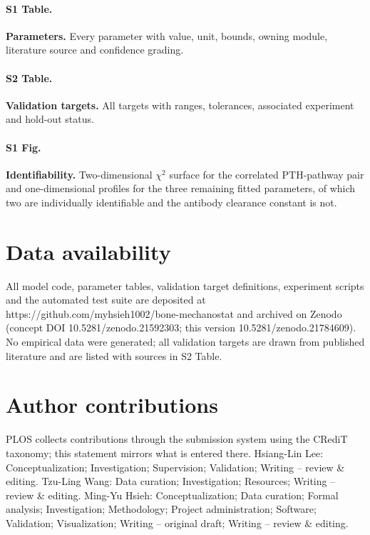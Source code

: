 \documentclass[10pt,letterpaper]{article}
\begin{document}
\paragraph*{S1 Table.}
\label{S1_Table}
{\bf Parameters.} Every parameter with value, unit, bounds, owning module,
literature source and confidence grading.

\paragraph*{S2 Table.}
\label{S2_Table}
{\bf Validation targets.} All targets with ranges, tolerances, associated
experiment and hold-out status.

\paragraph*{S1 Fig.}
\label{S1_Fig}
{\bf Identifiability.} Two-dimensional $\chi^2$ surface for the correlated
PTH-pathway pair and one-dimensional profiles for the three remaining fitted
parameters, of which two are individually identifiable and the antibody
clearance constant is not.

\section*{Data availability}

All model code, parameter tables, validation target definitions, experiment
scripts and the automated test suite are deposited at
https://github.com/myhsieh1002/bone-mechanostat and archived on Zenodo (concept
DOI 10.5281/zenodo.21592303; this version 10.5281/zenodo.21784609). No empirical data
were generated; all validation targets are drawn from published literature and
are listed with sources in S2 Table.

\section*{Author contributions}

PLOS collects contributions through the submission system using the CRediT
taxonomy; this statement mirrors what is entered there.
Hsiang-Lin Lee: Conceptualization; Investigation; Supervision; Validation; Writing -- review \& editing.
Tzu-Ling Wang: Data curation; Investigation; Resources; Writing -- review \& editing.
Ming-Yu Hsieh: Conceptualization; Data curation; Formal analysis;
Investigation; Methodology; Project administration; Software; Validation;
Visualization; Writing -- original draft; Writing -- review \& editing.
\end{document}
